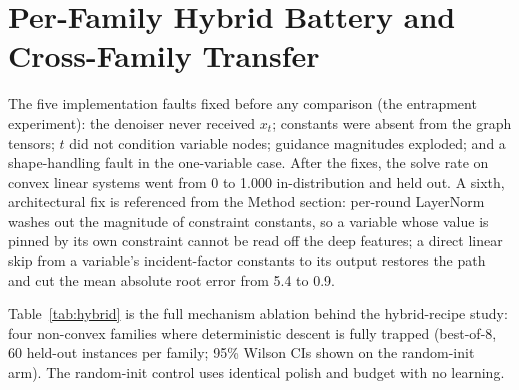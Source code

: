 
\section{Per-Family Hybrid Battery and Cross-Family Transfer}
\label{app:hybrid}

The five implementation faults fixed before any comparison (the entrapment experiment): the denoiser never
received $x_t$; constants were absent from the graph tensors; $t$ did not condition variable
nodes; guidance magnitudes exploded; and a shape-handling fault in the one-variable case.
After the fixes, the solve rate on convex linear systems went from 0 to 1.000 in-distribution
and held out. A sixth, architectural fix is referenced from the Method section: per-round
LayerNorm washes out the magnitude of constraint constants, so a variable whose value is
pinned by its own constraint cannot be read off the deep features; a direct linear skip from
a variable's incident-factor constants to its output restores the path and cut the mean
absolute root error from 5.4 to 0.9.

Table~\ref{tab:hybrid} is the full mechanism ablation behind the hybrid-recipe study: four non-convex
families where deterministic descent is fully trapped (best-of-8, 60 held-out instances per
family; 95\% Wilson CIs shown on the random-init arm). The random-init control uses identical polish and budget with no
learning.

